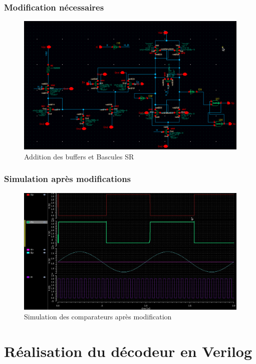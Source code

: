 \documentclass{beamer}
\begin{document}
\begin{frame}
\frametitle{Modification n\'ecessaires}

\begin{figure}[!htb]
  \includegraphics[width=0.9\linewidth]{comparateur_schema_cadence_SR.png}
  \caption{Addition des buffers et Bascules SR}
\end{figure}

\end{frame}


\begin{frame}
\frametitle{Simulation apr\`es modifications}

\begin{figure}[!htb]
  \includegraphics[width=0.9\linewidth]{sim_comp_after_SR_FF.jpg}
  \caption{Simulation des comparateurs apr\`es modification}
\end{figure}

\end{frame}


\section{R\'ealisation du d\'ecodeur en Verilog}
\end{document}

